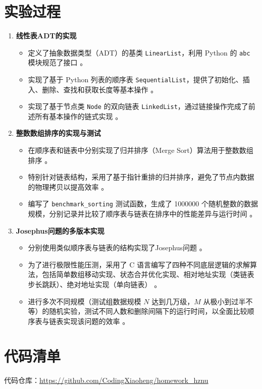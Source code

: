 \documentclass[12pt,a4paper]{ctexart}
\begin{document}
	\section{实验过程}
	\begin{enumerate}
		\item \textbf{线性表ADT的实现} 
		\begin{itemize}
			\item 定义了抽象数据类型（ADT）的基类 \texttt{LinearList}，利用 Python 的 \texttt{abc} 模块规范了接口 。
			\item 实现了基于 Python 列表的顺序表 \texttt{SequentialList}，提供了初始化、插入、删除、查找和获取长度等基本操作 。
			\item 实现了基于节点类 \texttt{Node} 的双向链表 \texttt{LinkedList}，通过链接操作完成了前述所有基本操作的链式实现 。
		\end{itemize}
		
		\item \textbf{整数数组排序的实现与测试}
		\begin{itemize}
			\item 在顺序表和链表中分别实现了归并排序（Merge Sort）算法用于整数数组排序 。
			\item 特别针对链表结构，采用了基于指针重排的归并排序，避免了节点内数据的物理拷贝以提高效率 。
			\item 编写了 \texttt{benchmark\_sorting} 测试函数，生成了 1000000 个随机整数的数据规模，分别记录并比较了顺序表与链表在排序中的性能差异与运行时间 。
		\end{itemize}
		
		\item \textbf{Josephus问题的多版本实现}
		\begin{itemize}
			\item 分别使用类似顺序表与链表的结构实现了Josephus问题 。
			\item 为了进行极限性能压测，采用了 C 语言编写了四种不同底层逻辑的求解算法，包括简单数组移动实现、状态合并优化实现、相对地址实现（类链表步长跳跃）、绝对地址实现（单向链表） 。
			\item 进行多次不同规模（测试组数据规模 $N$ 达到几万级，$M$ 从极小到过半不等）的随机实验，测试不同人数和删除间隔下的运行时间，以全面比较顺序表与链表实现该问题的效率 。
		\end{itemize}
	\end{enumerate}
	
	\section{代码清单}
	\noindent 
	代码仓库：\url{https://github.com/CodingXiaoheng/homework_hznu}
	
\end{document}
